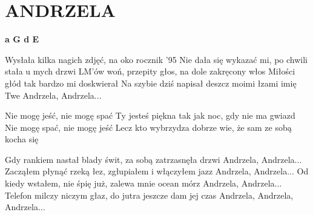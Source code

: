 \documentclass[../../../songbook.tex]{subfiles}
\begin{document}
\TabPositions{11cm} %
\section*{ANDRZELA}
{}
\vspace{0.5cm}
{\color{red}\textbf{a G d E} } \newline

Wysłała kilka nagich zdjęć, na oko rocznik '95 			 \newline
Nie dała się wykazać mi, po chwili stała u mych drzwi 	 \newline
LM'ów woń, przepity głos, na dole zakręcony włos 		 \newline
Miłości głód tak bardzo mi doskwierał 					 \newline
Na szybie dziś napisał deszcz moimi łzami imię Twe 		 \newline
Andrzela, Andrzela...  									 \newline
 
\-\hspace{1cm} Nie mogę jeść, nie mogę spać								 \newline
\-\hspace{1cm} Ty jesteś piękna tak jak noc, gdy nie ma gwiazd			 \newline
\-\hspace{1cm} Nie mogę spać, nie mogę jeść								 \newline
\-\hspace{1cm} Lecz kto wybrzydza dobrze wie, że sam ze sobą kocha się	 \newline
 
Gdy rankiem nastał blady świt, za sobą zatrzasnęła drzwi		 \newline
Andrzela, Andrzela...											 \newline
Zacząłem płynąć rzeką łez, zgłupiałem i włączyłem jazz					\newline
Andrzela, Andrzela...					\newline
Od kiedy wstałem, nie śpię już, zalewa mnie ocean mórz					\newline
Andrzela, Andrzela...					\newline
Telefon milczy niczym głaz, do jutra jeszcze dam jej czas					\newline
Andrzela, Andrzela, Andrzela...					\newline
\end{document}
